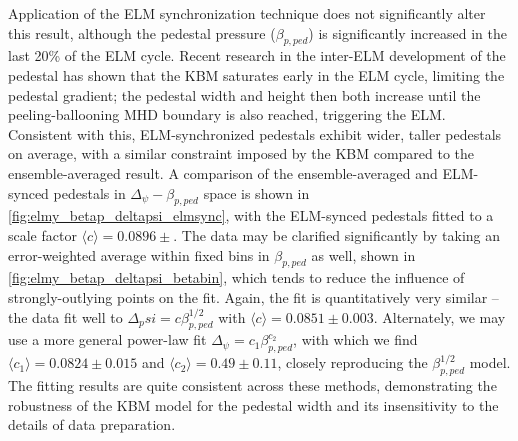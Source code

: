 \begin{figure}[ht]
 \pushtooutside
\end{figure}

Application of the ELM synchronization technique does not significantly alter this result, although the pedestal pressure (\ie $\beta_{p,ped}$) is significantly increased in the last 20\% of the ELM cycle.  Recent research in the inter-ELM development of the pedestal \cite{Diallo2014} has shown that the KBM saturates early in the ELM cycle, limiting the pedestal gradient; the pedestal width and height then both increase until the peeling-ballooning MHD boundary is also reached, triggering the ELM.  Consistent with this, ELM-synchronized pedestals exhibit wider, taller pedestals on average, with a similar constraint imposed by the KBM compared to the ensemble-averaged result.  A comparison of the ensemble-averaged and ELM-synced pedestals in $\Delta_\psi - \beta_{p,ped}$ space is shown in \cref{fig:elmy_betap_deltapsi_elmsync}, with the ELM-synced pedestals fitted to a scale factor $\langle c \rangle = 0.0896 \pm $.  The data may be clarified significantly by taking an error-weighted average within fixed bins in $\beta_{p,ped}$ as well, shown in \cref{fig:elmy_betap_deltapsi_betabin}, which tends to reduce the influence of strongly-outlying points on the fit.  Again, the fit is quantitatively very similar -- the data fit well to $\Delta_psi = c \beta_{p,ped}^{1/2}$ with $\langle c \rangle = 0.0851 \pm 0.003$.  Alternately, we may use a more general power-law fit $\Delta_\psi = c_1 \beta_{p,ped}^{c_2}$, with which we find $\langle c_1 \rangle = 0.0824 \pm 0.015$ and $\langle c_2 \rangle = 0.49 \pm 0.11$, closely reproducing the $\beta_{p,ped}^{1/2}$ model.  The fitting results are quite consistent across these methods, demonstrating the robustness of the KBM model for the pedestal width and its insensitivity to the details of data preparation.

